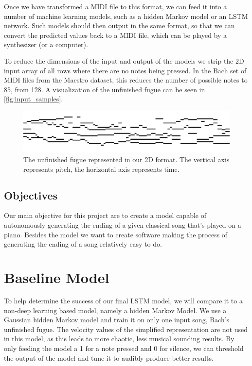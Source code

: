 \documentclass[11pt, twocolumn]{article}
\begin{document}
Once we have transformed a MIDI file to this format, we can feed it into a number of machine learning models, such as a hidden Markov model or an LSTM network. Such models should then output in the same format, so that we can convert the predicted values back to a MIDI file, which can be played by a synthesizer (or a computer).

To reduce the dimensions of the input and output of the models we strip the 2D input array of all rows where there are no notes being pressed. In the Bach set of MIDI files from the Maestro dataset, this reduces the number of possible notes to 85, from 128. A visualization of the unfinished fugue can be seen in \autoref{fig:input_samples}.


\begin{figure}[ht]
    \centering
    \includegraphics[width=\linewidth]{images/unfin_array.png}
    \caption{The unfinished fugue represented in our 2D format. The vertical axis represents pitch, the horizontal axis represents time.}
    \label{fig:input_samples}
\end{figure}
    
\subsection{Objectives}
Our main objective for this project are to create a model capable of autonomously generating the ending of a given classical song that's played on a piano. Besides the model we want to create software making the process of generating the ending of a song relatively easy to do.

\section{Baseline Model}
To help determine the success of our final LSTM model, we will compare it to a non-deep learning based model, namely a hidden Markov Model. We use a Gaussian hidden Markov model and train it on only one input song, Bach's unfinished fugue. The velocity values of the simplified representation are not used in this model, as this leads to more chaotic, less musical sounding results. By only feeding the model a 1 for a note pressed and 0 for silence, we can threshold the output of the model and tune it to audibly produce better results.
\end{document}
